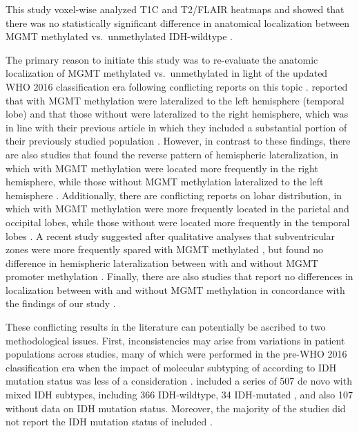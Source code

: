 This study voxel-wise analyzed \gls{T1C} and \gls{T2}/\gls{FLAIR} heatmaps and showed that there was no statistically significant difference in anatomical localization between \gls{MGMT} methylated vs.\ unmethylated \gls{IDH}-wildtype .

The primary reason to initiate this study was to re-evaluate the anatomic localization of \gls{MGMT} methylated vs.\ unmethylated  in light of the updated \gls{WHO} 2016 classification era following conflicting reports on this topic \autocite{smits2017imaging}.
 reported that  with \gls{MGMT} methylation were lateralized to the left hemisphere (temporal lobe) and that those without were lateralized to the right hemisphere, which was in line with their previous article in which they included a substantial portion of their previously studied  population \autocite{ellingson2012anatomic}.
However, in contrast to these findings, there are also studies that found the reverse pattern of hemispheric lateralization, in which  with \gls{MGMT} methylation were located more frequently in the right hemisphere, while those without \gls{MGMT} methylation lateralized to the left hemisphere \autocite{wang2014anatomical}.
Additionally, there are conflicting reports on lobar distribution, in which  with \gls{MGMT} methylation were more frequently located in the parietal and occipital lobes, while those without were located more frequently in the temporal lobes \autocite{eoli2007methylation}.
A recent study suggested after qualitative analyses that subventricular zones were more frequently spared with \gls{MGMT} methylated , but found no difference in hemispheric lateralization between  with and without \gls{MGMT} promoter methylation \autocite{han2018structural}.
Finally, there are also studies that report no differences in localization between  with and without \gls{MGMT} methylation in concordance with the findings of our study \autocite{carillo2012relationship, drabycz2010analysis}.

These conflicting results in the literature can potentially be ascribed to two methodological issues.
First, inconsistencies may arise from variations in  patient populations across studies, many of which were performed in the pre-\gls{WHO} 2016 classification era when the impact of molecular subtyping of  according to \gls{IDH} mutation status was less of a consideration \autocite{louis20162016}.
 included a series of 507 de novo  with mixed \gls{IDH} subtypes, including 366 \gls{IDH}-wildtype, 34 \gls{IDH}-mutated , and also 107  without data on \gls{IDH} mutation status.
Moreover, the majority of the studies did not report the \gls{IDH} mutation status of included  \autocite{ellingson2012anatomic,wang2014anatomical,eoli2007methylation,drabycz2010analysis}.

